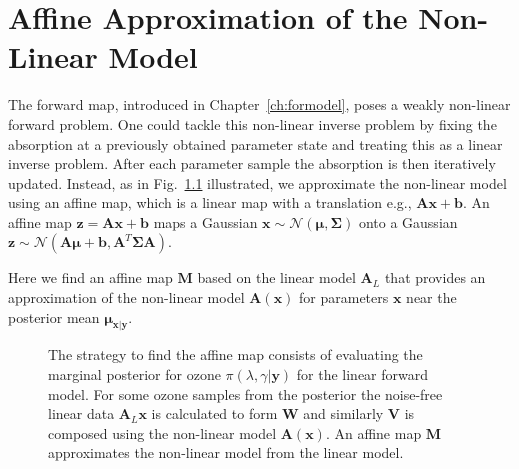 \chapter{Affine Approximation of the Non-Linear Model}
\label{ch:affine}

\newcommand*{\vertbar}{\rule[-1ex]{0.5pt}{2.5ex}}
\newcommand*{\horzbar}{\rule[.5ex]{2.5ex}{0.5pt}}
The forward map, introduced in Chapter~\ref{ch:formodel}, poses a weakly non-linear forward problem.
One could tackle this non-linear inverse problem by fixing the absorption at a previously obtained parameter state and treating this as a linear inverse problem.
After each parameter sample the absorption is then iteratively updated.
Instead, as in Fig.~\ref{fig:affinStrat} illustrated, we approximate the non-linear model using an affine map, which is a linear map with a translation e.g., $\bm{A}\bm{x} + \bm{b}$.
An affine map $ \bm{z} = \bm{A}\bm{x} + \bm{b}$ maps a Gaussian $\bm{x} \sim \mathcal{N}(\bm{\mu}, \bm{\Sigma})$ onto a Gaussian $\bm{z} \sim \mathcal{N}(\bm{A}\bm{\mu} + \bm{b}, \bm{A}^T\bm{\Sigma}\bm{A})$.

Here we find an affine map $\bm{M}$ based on the linear model $\bm{A}_L$ that provides an approximation of the non-linear model $\bm{A}(\bm{x})$ for parameters $\bm{x}$ near the posterior mean $\bm{\mu}_{\bm{x}|\bm{y}}$.
\begin{figure}[htb!]
	\centering
	\caption[Strategy to find affine map.]{The strategy to find the affine map consists of evaluating the marginal posterior for ozone $\pi(\lambda , \gamma  | \bm{y})$ for the linear forward model. For some ozone samples from the posterior the noise-free linear data $\bm{A}_L \bm{x}$ is calculated to form $\bm{W}$ and similarly $\bm{V}$ is composed using the non-linear model $\bm{A}(\bm{x})$. An affine map $\bm{M}$ approximates the non-linear model from the linear model.}
	\label{fig:affinStrat}
\end{figure}


